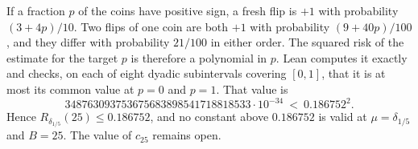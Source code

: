 If a fraction $p$ of the coins have positive sign, a fresh flip is $+1$
with probability $(3+4p)/10$. Two flips of one coin are both $+1$ with
probability $(9+40p)/100$, and they differ with probability $21/100$ in
either order. The squared risk of the estimate for the target $p$ is
therefore a polynomial in $p$. Lean computes it exactly and checks, on
each of eight dyadic subintervals covering $[0,1]$, that it is at most
its common value at $p=0$ and $p=1$. That value is
\[
 348763093753675683898541718818533\cdot10^{-34}\ <\ 0.186752^2 .
\]
Hence $R_{\delta_{1/5}}(25)\le0.186752$,
and no constant above $0.186752$ is valid at $\mu=\delta_{1/5}$ and
$B=25$. The value of $c_{25}$ remains open.
